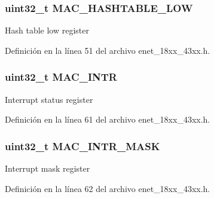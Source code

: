 \subsubsection[{\texorpdfstring{M\+A\+C\+\_\+\+H\+A\+S\+H\+T\+A\+B\+L\+E\+\_\+\+L\+OW}{MAC_HASHTABLE_LOW}}]{ uint32\+\_\+t M\+A\+C\+\_\+\+H\+A\+S\+H\+T\+A\+B\+L\+E\+\_\+\+L\+OW}\hypertarget{struct_l_p_c___e_n_e_t___t_a4177c1198137537bf14e66c28c0da8cd}{}\label{struct_l_p_c___e_n_e_t___t_a4177c1198137537bf14e66c28c0da8cd}
Hash table low register 

Definición en la línea 51 del archivo enet\+\_\+18xx\+\_\+43xx.\+h.

\subsubsection[{\texorpdfstring{M\+A\+C\+\_\+\+I\+N\+TR}{MAC_INTR}}]{ uint32\+\_\+t M\+A\+C\+\_\+\+I\+N\+TR}\hypertarget{struct_l_p_c___e_n_e_t___t_a77a888f784437c7309c4b287f8d262c4}{}\label{struct_l_p_c___e_n_e_t___t_a77a888f784437c7309c4b287f8d262c4}
Interrupt status register 

Definición en la línea 61 del archivo enet\+\_\+18xx\+\_\+43xx.\+h.

\subsubsection[{\texorpdfstring{M\+A\+C\+\_\+\+I\+N\+T\+R\+\_\+\+M\+A\+SK}{MAC_INTR_MASK}}]{ uint32\+\_\+t M\+A\+C\+\_\+\+I\+N\+T\+R\+\_\+\+M\+A\+SK}\hypertarget{struct_l_p_c___e_n_e_t___t_a882b735620b7b7b0c332c0687c9e00ca}{}\label{struct_l_p_c___e_n_e_t___t_a882b735620b7b7b0c332c0687c9e00ca}
Interrupt mask register 

Definición en la línea 62 del archivo enet\+\_\+18xx\+\_\+43xx.\+h.

